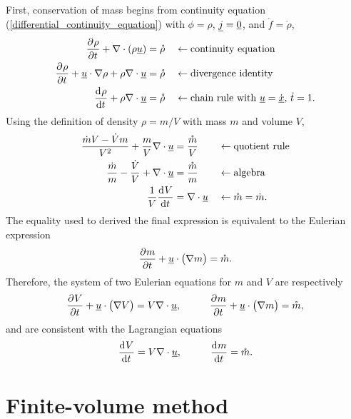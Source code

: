 First, conservation of mass begins from continuity equation (\ref{differential_continuity_equation}) with $\phi = \rho$, $\underline{j} = \underline{0}$, and $\mathring{f} = \mathring{\rho}$,
\begin{align*}
  \frac{\partial{^{}} \rho}{\partial t{^{}} } + \nabla \cdot \left( \rho \underline{u} \right) = \mathring{\rho}& && \leftarrow \text{continuity equation} \\ 
  \frac{\partial{^{}} \rho}{\partial t{^{}} } + \underline{u} \cdot \nabla \rho + \rho \nabla \cdot \underline{u} = \mathring{\rho}& && \leftarrow \text{divergence identity} \\ 
  \frac{\mathrm{d}{^{}} \rho}{\mathrm{d} t{^{}} } + \rho \nabla \cdot \underline{u} = \mathring{\rho}& && \leftarrow \text{chain rule with $\underline{u} = \dot{\underline{x}}$, $\dot{t} = 1$}.
\end{align*}
Using the definition of density $\rho = m/V$ with mass $m$ and volume $V$,
\begin{align*}
  \frac{\dot{m}V - \dot{V}m}{V^2} + \frac{m}{V} \nabla \cdot \underline{u} &= \frac{\mathring{m}}{V} && \leftarrow \text{quotient rule} \\
  \frac{\dot{m}}{m} - \frac{\dot{V}}{V} + \nabla \cdot \underline{u} &= \frac{\mathring{m}}{m} && \leftarrow \text{algebra} \\
  \frac{1}{V} \frac{\mathrm{d}{^{}} V}{\mathrm{d} t{^{}} } &= \nabla \cdot \underline{u} && \leftarrow \text{$\mathring{m} = \dot{m}$}.
\end{align*}
The equality used to derived the final expression is equivalent to the Eulerian expression
\begin{align*}
  \frac{\partial{^{}} m}{\partial t{^{}} } + \underline{u} \cdot \big( \nabla m \big) = \mathring{m}.
\end{align*}
Therefore, the system of two Eulerian equations for $m$ and $V$ are respectively
\begin{align*}
  \parder{V}{t} + \rankone{u} \cdot \big( \nabla V \big) = V \nabla \cdot \rankone{u}, \hspace{10mm} 
  \parder{m}{t} + \rankone{u} \cdot \big( \nabla m \big) = \mathring{m},
\end{align*}
and are consistent with the Lagrangian equations 
\begin{align*}
  \totder{V}{t} = V \nabla \cdot \rankone{u}, \hspace{10mm}
  \totder{m}{t} = \mathring{m}.
\end{align*}

\section{Finite-volume method} \label{ssn_finite_volume_method}

